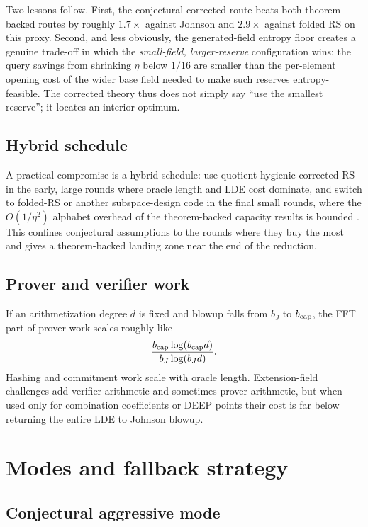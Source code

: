 \documentclass[11pt]{article}
\theoremstyle{definition}
\begin{document}
Two lessons follow.  First, the conjectural corrected route beats both theorem-backed routes by roughly $1.7\times$ against Johnson and $2.9\times$ against folded RS on this proxy.  Second, and less obviously, the generated-field entropy floor creates a genuine trade-off in which the \emph{small-field, larger-reserve} configuration wins: the query savings from shrinking $\eta$ below $1/16$ are smaller than the per-element opening cost of the wider base field needed to make such reserves entropy-feasible.  The corrected theory thus does not simply say ``use the smallest reserve''; it locates an interior optimum.

\subsection{Hybrid schedule}

A practical compromise is a hybrid schedule: use quotient-hygienic corrected RS in the early, large rounds where oracle length and LDE cost dominate, and switch to folded-RS or another subspace-design code in the final small rounds, where the $O(1/\eta^2)$ alphabet overhead of the theorem-backed capacity results is bounded \cite{CZ25,GG25,ABF26}.  This confines conjectural assumptions to the rounds where they buy the most and gives a theorem-backed landing zone near the end of the reduction.

\subsection{Prover and verifier work}

If an arithmetization degree $d$ is fixed and blowup falls from $b_J$ to $b_{\rm cap}$, the FFT part of prover work scales roughly like
\[
        \frac{b_{\rm cap}\log(b_{\rm cap}d)}{b_J\log(b_Jd)} .
\]
Hashing and commitment work scale with oracle length.  Extension-field challenges add verifier arithmetic and sometimes prover arithmetic, but when used only for combination coefficients or DEEP points their cost is far below returning the entire LDE to Johnson blowup.

\section{Modes and fallback strategy}
\label{sec:modes}

\subsection{Conjectural aggressive mode}
\end{document}
